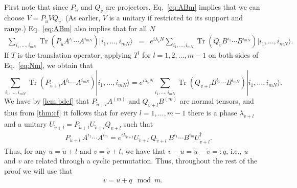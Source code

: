\documentclass[pra,a4paper,notitlepage,nofootinbib,superscriptaddress]{revtex4-1}
\theoremstyle{plain}
\newcommand{\1}{{\openone}}
\newcommand{\be}{\begin{eqnarray}}
\newcommand{\ee}{\end{eqnarray}}
\newcommand{\ra}{\rangle}
\DeclareMathOperator{\tr}{Tr}
\begin{document}
First note that since $P_{\tilde u}$ and $Q_{\tilde v}$ are projectors,
Eq.\ \eqref{eq:ABm} implies that we can choose $V = P_{\tilde u}VQ_{\tilde
            v}$.  (As earlier, $V$ is a unitary if restricted to its support and range.)
Eq.~\eqref{eq:ABm} also implies that for all $N$
\be
    \sum_{i_1,\ldots, i_{mN}} \tr(P_{\tilde u} A^{i_1} \cdots A^{i_{mN}} ) |i_1,\ldots, i_{mN}\ra
    &=&
    e^{i\lambda_{\tilde v} N}\sum_{i_1,\ldots, i_{mN}}
    \tr(Q_{\tilde v}B^{i_1} \cdots B^{i_{mN}} ) |i_1,\ldots, i_{mN}\ra .\quad
    \label{eq:Nm}
\ee
If $T$ is the translation operator, applying $T^l$ for $l=1,2,\ldots, m-1$ on both sides of Eq.\ \eqref{eq:Nm}, we obtain that
$$
    \sum_{i_1,\ldots, i_{mN}} \tr(P_{\tilde u+l} A^{i_1} \cdots A^{i_{mN}} )
    |i_1,\ldots, i_{mN}\ra
    =
    e^{i\lambda_{\tilde v} N} \sum_{i_1,\ldots, i_{mN}}
    \tr(Q_{\tilde v+l}B^{i_1} \cdots B^{i_{mN}} ) |i_1,\ldots, i_{mN}\ra . \qquad
$$
We have by \cref{lem:bdcf} that $P_{\tilde u+l} A^{(m)}$ and $Q_{\tilde
            v+l} B^{(m)}$ are normal tensors, and thus from \cref{thm:cf} it follows
that for every $l=1,\ldots, m-1$ there is a phase $\lambda_{\tilde v+l}$
and a unitary $U_{\tilde v+l}=P_{\tilde u+l} U_{\tilde v+l} Q_{\tilde
            v+l}$ such that
\be
    &&P_{\tilde u+l} \: A^{i_1} \cdots A^{i_m}  = e^{i\lambda_{\tilde v+l}}
    U_{\tilde v+l}\: Q_{\tilde v+l} \: B^{i_1} \cdots B^{i_m}U_{\tilde v+l}^{\dagger} .
    \label{eq:blockedABprop}
\ee
Thus, for any $u=\tilde u+l$ and $v=\tilde v+l$, we have that $v-u=\tilde
    u-\tilde v=:q$, i.e., $u$ and $v$ are related through a cyclic permutation.
Thus, throughout the rest of the proof we will use that
\be
    v= u+q \mod m. \label{eq:vprop}
\ee
\end{document}
